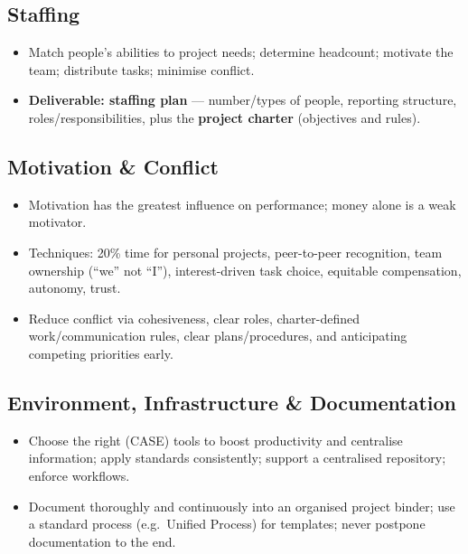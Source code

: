\documentclass[hidelinks]{article}
\begin{document}
\subsection{Staffing}
\begin{itemize}
  \item Match people's abilities to project needs; determine headcount; motivate the team;
        distribute tasks; minimise conflict.
  \item \textbf{Deliverable: staffing plan} --- number/types of people, reporting structure,
        roles/responsibilities, plus the \textbf{project charter} (objectives and rules).
\end{itemize}


\subsection{Motivation \& Conflict}
\begin{itemize}
  \item Motivation has the greatest influence on performance; money alone is a weak motivator.
  \item Techniques: 20\% time for personal projects, peer-to-peer recognition, team ownership
        (``we'' not ``I''), interest-driven task choice, equitable compensation, autonomy, trust.
  \item Reduce conflict via cohesiveness, clear roles, charter-defined work/communication rules,
        clear plans/procedures, and anticipating competing priorities early.
\end{itemize}

\subsection{Environment, Infrastructure \& Documentation}
\begin{itemize}
  \item Choose the right (CASE) tools to boost productivity and centralise information;
        apply standards consistently; support a centralised repository; enforce workflows.
  \item Document thoroughly and continuously into an organised project binder; use a standard
        process (e.g.\ Unified Process) for templates; never postpone documentation to the end.
\end{itemize}
\end{document}
